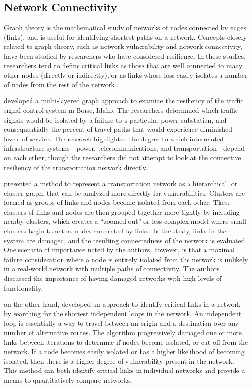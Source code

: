 \subsection{Network Connectivity}

Graph theory is the mathematical study of networks of nodes connected by
edges (links), and is useful for identifying shortest paths on a network.
Concepts closely related to graph theory, such as network
vulnerability and network connectivity, have been studied by researchers who
have considered resilience. In these studies, researchers tend to define
critical links as those
that are well connected to many other nodes (directly or indirectly), or as links
whose loss easily isolates a
number of nodes from the rest of the network \citep{west2001}.

\citet{abdel2007} developed a multi-layered graph approach to examine the resiliency
of the traffic
signal control system in Boise, Idaho. The researchers determined which
traffic signals would be isolated by a failure to a particular power
substation,
and consequentially the percent of travel paths that would experience
diminished
levels of service. The research highlighted the degree to which interrelated
infrastructure systems---power, telecommunications, and transportation---depend on each other, though the researchers did not attempt to look at the
connective resiliency of the transportation network directly.

\citet{agarwal2011} presented a method to represent a transportation network
as a
hierarchical, or cluster graph, that can be analyzed more directly for
vulnerabilities. Clusters are formed as groups of links and nodes become
isolated from each other. These clusters of links and nodes are then grouped
together more tightly by including nearby clusters, which creates a
``zoomed out'' or less complex model where small clusters begin to act as nodes connected by links.
In the study, links in the system are damaged, and the resulting
connectedness of the network is evaluated. One scenario of importance
noted by the authors, however, is that a maximal failure consideration where a
node
is entirely isolated from the network is unlikely in a real-world network
with
multiple paths of connectivity. The authors discussed the importance of
having damaged networks with high levels of functionality.

\citet{vodak2019}
on the other hand, developed an approach to identify
critical links in a network by searching for the shortest independent
loops in the network. An independent loop is essentially a way to travel
between an origin and a destination over any number of alternative routes.
The algorithm progressively damaged one or more links
between iterations to determine if nodes become isolated, or cut off from
the
network. If a node becomes easily isolated or has a higher likelihood of
becoming isolated, then there is a higher degree of vulnerability present
in the
network. This method can both identify critical links in individual
networks and provide a means to quantitatively compare networks.

